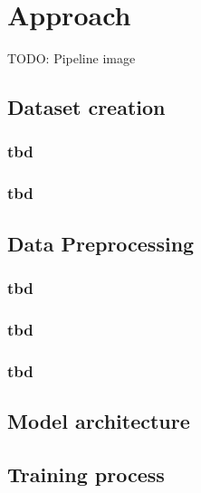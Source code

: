 \section{Approach} 
\label{approach}

TODO: Pipeline image

\subsection{Dataset creation} 
\label{ch:approachA}

\subsubsection{tbd}
\label{ch:approachAa}


\subsubsection{tbd}
\label{ch:approachAb}


\subsection{Data Preprocessing} 
\label{ch:approachB}

\subsubsection{tbd}
\label{ch:approachBa}


\subsubsection{tbd}
\label{ch:approachBb}


\subsubsection{tbd}
\label{ch:approachBc}

\subsection{Model architecture} 
\label{ch:approachC}

\subsection{Training process} 
\label{ch:approachD}


\newpage
